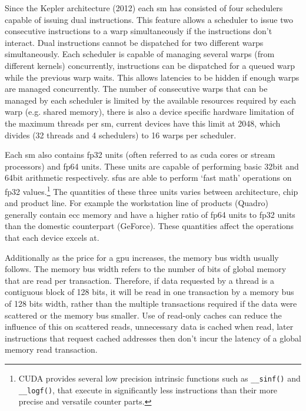       Since the Kepler architecture (2012)\cite{NV_KEPLER} each \gls{sm} has consisted of four schedulers capable of issuing dual instructions. This feature allows a scheduler to issue two consecutive instructions to a warp simultaneously if the instructions don't interact. Dual instructions cannot be dispatched for two different warps simultaneously. Each scheduler is capable of managing several warps (from different kernels) concurrently, instructions can be dispatched for a queued warp while the previous warp waits. This allows latencies to be hidden if enough warps are managed concurrently. The number of consecutive warps that can be managed by each scheduler is limited by the available resources required by each warp (e.g. shared memory), there is also a device specific hardware limitation of the maximum threads per \gls{sm}, current devices have this limit at 2048, which divides (32 threads and 4 schedulers) to 16 warps per scheduler. \cite{PM13}

      Each \gls{sm} also contains \gls{fp32} units (often referred to as \gls{cuda} cores or stream processors) and \gls{fp64} units. These units are capable of performing basic 32bit and 64bit arithmetic respectively. \glspl{sfu} are able to perform `fast math' operations on \gls{fp32} values.\footnote{CUDA provides several low precision intrinsic functions such as \lstinline!__sinf()! and \lstinline!__logf()!, that execute in significantly less instructions than their more precise and versatile counter parts.} The quantities of these three units varies between architecture, chip and product line. For example the workstation line of products (Quadro) generally contain \gls{ecc} memory and have a higher ratio of \gls{fp64} units to \gls{fp32} units than the domestic counterpart (GeForce). These quantities affect the operations that each device excels at.

      Additionally as the price for a \gls{gpu} increases, the memory bus width usually follows. The memory bus width refers to the number of bits of global memory that are read per transaction. Therefore, if data requested by a thread is a contiguous block of 128 bits, it will be read in one transaction by a memory bus of 128 bits width, rather than the multiple transactions required if the data were scattered or the memory bus smaller. Use of read-only caches can reduce the influence of this on scattered reads, unnecessary data is cached when read, later instructions that request cached addresses then don't incur the latency of a global memory read transaction.

